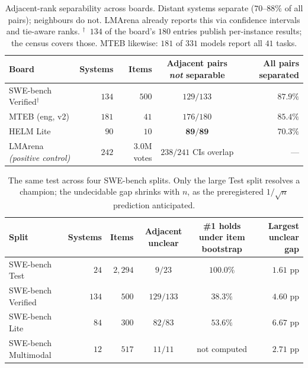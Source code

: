 \documentclass[11pt]{article}
\begin{document}
\begin{table}[t]
\centering
\small
\begin{tabular}{lrrcr}
\toprule
Board & Systems & Items & Adjacent pairs \emph{not} separable & All pairs separated\\
\midrule
SWE-bench Verified$^{\dagger}$ & $134$ & $500$ & $129/133$ & $87.9\%$\\
MTEB (eng, v2)     & $181$ & $41$  & $176/180$ & $85.4\%$\\
HELM Lite          & $90$  & $10$  & $\mathbf{89/89}$ & $70.3\%$\\
\midrule
LMArena \emph{(positive control)} & $242$ & 3.0M votes & $238/241$ CIs overlap & ---\\
\bottomrule
\end{tabular}
\caption{Adjacent-rank separability across boards. Distant systems separate ($70$--$88\%$ of all
pairs); neighbours do not. LMArena already reports this via confidence intervals and tie-aware ranks.
$^{\dagger}$~$134$ of the board's $180$ entries publish per-instance results; the census covers those.
MTEB likewise: $181$ of $331$ models report all $41$ tasks.}
\label{tab:main}
\end{table}

\begin{table}[t]
\centering
\small
\begin{tabular}{lrrccr}
\toprule
Split & Systems & Items & Adjacent unclear & \#1 holds under item bootstrap & Largest unclear gap\\
\midrule
SWE-bench Test        & $24$  & $2{,}294$ & $9/23$  & $100.0\%$ & $1.61$ pp\\
SWE-bench Verified    & $134$ & $500$     & $129/133$ & $38.3\%$ & $4.60$ pp\\
SWE-bench Lite        & $84$  & $300$     & $82/83$ & $53.6\%$   & $6.67$ pp\\
SWE-bench Multimodal  & $12$  & $517$     & $11/11$ & not computed & $2.71$ pp\\
\bottomrule
\end{tabular}
\caption{The same test across four SWE-bench splits. Only the large Test split resolves a champion;
the undecidable gap shrinks with $n$, as the preregistered $1/\sqrt{n}$ prediction anticipated.}
\label{tab:splits}
\end{table}
\end{document}
